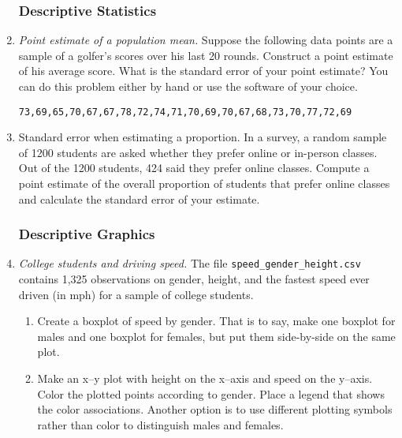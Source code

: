 \begin{enumerate}
\subsubsection*{Descriptive Statistics}

\item \emph{Point estimate of a population mean.} Suppose the
  following data points are a sample of a golfer's scores over his last 20 rounds.
  Construct a point estimate of his average score. What is the standard error of your point estimate? You can do
  this problem either by hand or use the software of your choice. 
\begin{verbatim}
73,69,65,70,67,67,78,72,74,71,70,69,70,67,68,73,70,77,72,69
\end{verbatim}
  
\item {Standard error when estimating a proportion.} In a survey, a
  random sample of \num{1200} students are asked whether they prefer online or in-person classes. 
  Out of the \num{1200} students, \num{424} said they prefer online classes. Compute a point estimate 
  of the overall proportion of students that prefer online classes and calculate the standard error of your estimate. 

\subsubsection*{Descriptive Graphics}

\item \emph{College students and driving speed.} The file
  \texttt{speed\_gender\_height.csv} contains 1,325 observations on
  gender, height, and the fastest speed ever driven (in mph) for a
  sample of college students.

\begin{enumerate}
\item Create a boxplot of speed by gender. That is to say, make one
  boxplot for males and one boxplot for females, but put them
  side-by-side on the same plot.
\item Make an x--y plot with height on the x--axis and speed on the
  y--axis. Color the plotted points according to gender. Place a
  legend that shows the color associations. Another option is to use
  different plotting symbols rather than color to distinguish males
  and females.
\end{enumerate}

\end{enumerate}

